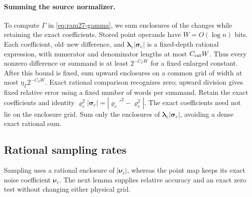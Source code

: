 \documentclass[11pt]{article}
\theoremstyle{remark}
\newcommand{\llambda}{\boldsymbol{\lambda}}
\newcommand{\vvr}{\boldsymbol{\varrho}}
\newcommand{\ssigma}{\boldsymbol{\sigma}}
\newcommand{\nnu}{\boldsymbol{\nu}}
\begin{document}
\paragraph{Summing the source normalizer.}\label{par:ram30-source-normalizer}
To compute $\Gamma$ in \eqref{eq:ram27-gamma}, we sum enclosures of the changes
while retaining the exact coefficients.
Stored point operands have $W=O(\log n)$ bits.
Each coefficient, old--new difference, and $\llambda_e|\ssigma_e|$ is a fixed-depth
rational expression, with numerator and denominator lengths at most $C_{\rm
rat}W$.
Thus every nonzero difference or summand is at least $2^{-C_\Gamma W}$ for a
fixed enlarged constant.
After this bound is fixed, sum upward enclosures on a common grid of width at
most $\eta_\Gamma2^{-C_\Gamma W}$.
Exact rational comparison recognizes zero; upward division gives fixed relative
error using a fixed number of words per summand.
Retain the exact coefficients and identity $\vvr_e^2|\ssigma_e|=|\vvr_e'^2-\vvr_e^2|$.
The exact coefficients need not lie on the enclosure grid.
Sum only the enclosures of $\llambda_e|\ssigma_e|$, avoiding a dense exact rational
sum.

\subsection{Rational sampling rates}

Sampling uses a rational enclosure of $|\nnu_c|$, whereas the point map keeps its
exact noise coefficient $\nnu_c$.
The next lemma supplies relative accuracy and an exact zero test without
changing either physical grid.
\end{document}
